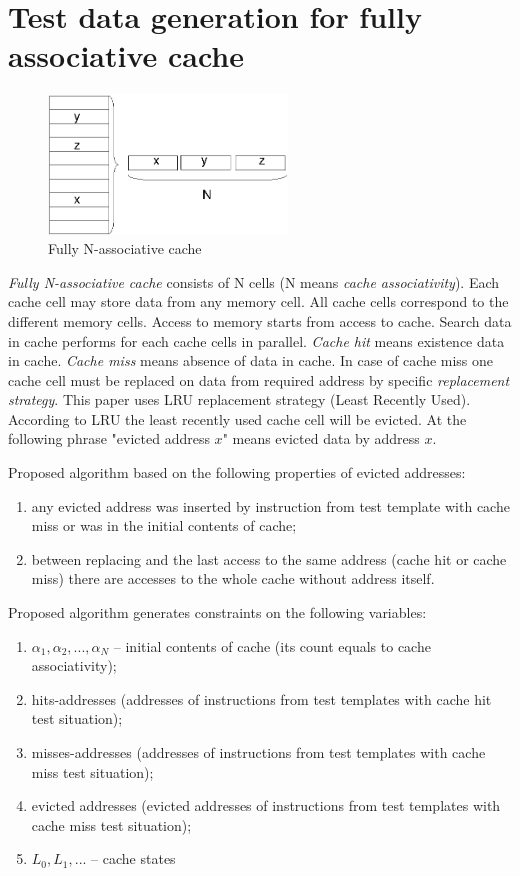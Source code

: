 \section{Test data generation for fully associative cache}

\begin{figure}[h]
\centering
\includegraphics[width=2.5in]{full}
\caption{Fully N-associative cache} \label{full_assoc}
\end{figure}

\emph{Fully N-associative cache} consists of N cells (N means
\emph{cache associativity}). Each cache cell may store data from any
memory cell. All cache cells correspond to the different memory
cells. Access to memory starts from access to cache. Search data in
cache performs for each cache cells in parallel. \emph{Cache hit}
means existence data in cache. \emph{Cache miss} means absence of
data in cache. In case of cache miss one cache cell must be replaced
on data from required address by specific \emph{replacement
strategy}. This paper uses LRU replacement strategy (Least Recently
Used). According to LRU the least recently used cache cell will be
evicted. At the following phrase "evicted address $x$" means evicted
data by address $x$.

Proposed algorithm based on the following properties of evicted
addresses:
\begin{enumerate}
\item any evicted address was inserted by instruction from test template
with cache miss or was in the initial contents of cache;
\item between replacing and the last access to the same address
(cache hit or cache miss) there are accesses to the whole cache
without address itself.
\end{enumerate}

Proposed algorithm generates constraints on the following variables:
\begin{enumerate}
\item $\alpha_1, \alpha_2, ...,\alpha_N$ --  initial contents of cache
(its count equals to cache associativity);
\item hits-addresses (addresses of instructions from test templates
with cache hit test situation);
\item misses-addresses (addresses of instructions from test templates
with cache miss test situation);
\item evicted addresses (evicted addresses of instructions from test templates
with cache miss test situation);
\item $L_0, L_1, ...$ -- cache states
\end{enumerate}

